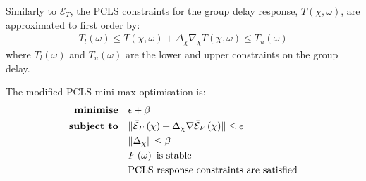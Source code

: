 \documentclass[a4paper,twoside,10pt,english]{article}
\DeclarePairedDelimiter{\mathnorm}{\lVert}{\rVert}
\begin{document}
Similarly to $\bar{\mathcal{E}}_{T}$, the PCLS constraints for the group delay
response, $T\left(\chi,\omega\right)$, are approximated to first order by:
\begin{align*}
  T_{l}\left(\omega\right) \le
  T\left(\chi,\omega\right) + \Delta_{\chi}\nabla_{\chi}T\left(\chi,\omega\right)
  \le T_{u}\left(\omega\right)
\end{align*}
where $T_{l}\left(\omega\right)$ and $T_{u}\left(\omega\right)$ are the
lower and upper constraints on the group delay.

The modified PCLS mini-max optimisation is:
\begin{align}
\begin{split}
  \textbf{minimise}\quad & \epsilon+\beta \\
  \textbf{subject to}\quad & \mathnorm{\bar{\mathcal{E}}_{F}\left(\chi\right) +
          \Delta_{\chi}\nabla\bar{\mathcal{E}}_{F}\left(\chi\right)}\le\epsilon \\
  & \mathnorm{\Delta_{\chi}}\le\beta \\
  & F\left(\omega\right)\text{ is stable} \\
  & \text{PCLS response constraints are satisfied}
\end{split}
\label{eqn:Optimisation-of-PCLS-response-error}
\end{align}
\end{document}
